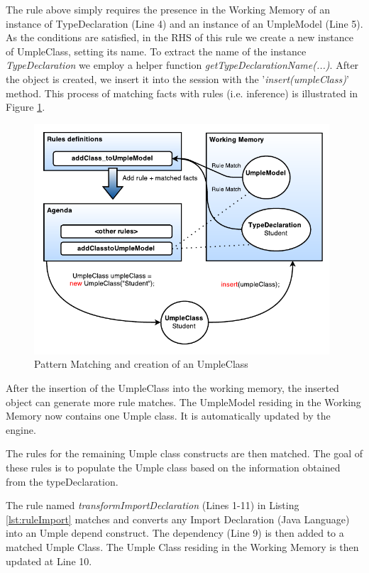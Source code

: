 The rule above simply requires the presence in the Working Memory of an instance of TypeDeclaration (Line 4) and an instance of an UmpleModel (Line 5). As the conditions are satisfied, in the RHS of this rule we create a new instance of UmpleClass, setting its name. To extract the name of the instance \textit{TypeDeclaration} we employ a helper function \textit{getTypeDeclarationName(...)}. After the object is created, we insert it into the session with the '\textit{insert(umpleClass)}' method. This process of matching facts with rules (i.e. inference) is illustrated in Figure \ref{fig:ruleModel}.

\begin{figure}[h]
\centering
\includegraphics[width=0.98\textwidth]{Figures/ruleModel.pdf}
\caption{Pattern Matching and creation of an UmpleClass}
\label{fig:ruleModel}
\end{figure}

After the insertion of the UmpleClass into the working memory, the inserted object can generate more rule matches. The UmpleModel residing in the Working Memory now contains one Umple class. It is automatically updated by the engine.

The rules for the remaining Umple class constructs are then matched. The goal of these rules is to populate the Umple class based on the information obtained from the typeDeclaration. 

The rule named \textit{transformImportDeclaration} (Lines 1-11) in Listing \ref{lst:ruleImport} matches and converts any Import Declaration (Java Language) into an Umple depend construct. The dependency (Line 9) is then added to a matched Umple Class. The Umple Class residing in the Working Memory is then updated at Line 10.


